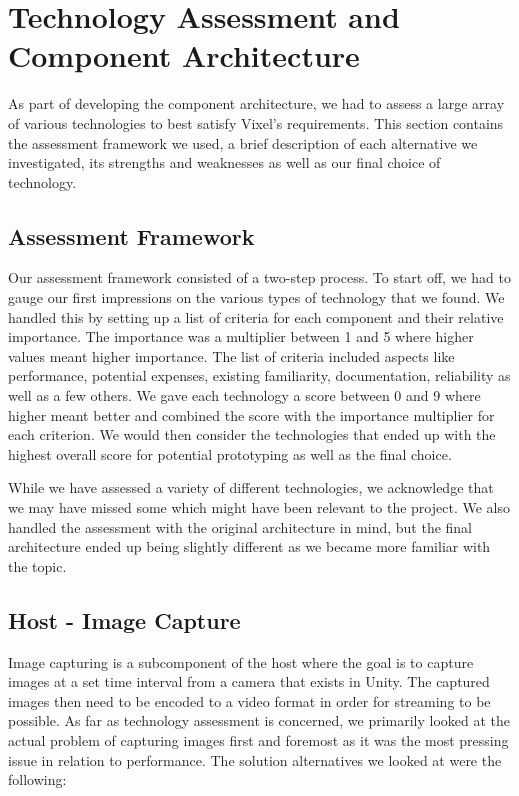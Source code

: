 \section{Technology Assessment and Component Architecture}
As part of developing the component architecture, we had to assess a large array of various technologies to best satisfy Vixel's requirements. This section contains the assessment framework we used, a brief description of each alternative we investigated, its strengths and weaknesses as well as our final choice of technology.

\subsection{Assessment Framework}
Our assessment framework consisted of a two-step process. To start off, we had to gauge our first impressions on the various types of technology that we found.
We handled this by setting up a list of criteria for each component and their relative importance. The importance was a multiplier between 1 and 5 where higher values meant higher importance. The list of criteria included aspects like performance, potential expenses, existing familiarity, documentation, reliability as well as a few others. We gave each technology a score between 0 and 9 where higher meant better and combined the score with the importance multiplier for each criterion. We would then consider the technologies that ended up with the highest overall score for potential prototyping as well as the final choice. 

While we have assessed a variety of different technologies, we acknowledge that we may have missed some which might have been relevant to the project. We also handled the assessment with the original architecture in mind, but the final architecture ended up being slightly different as we became more familiar with the topic.  

\subsection{Host - Image Capture}
Image capturing is a subcomponent of the host where the goal is to capture images at a set time interval from a camera that exists in Unity. The captured images then need to be encoded to a video format in order for streaming to be possible. As far as technology assessment is concerned, we primarily looked at the actual problem of capturing images first and foremost as it was the most pressing issue in relation to performance. The solution alternatives we looked at were the following:


